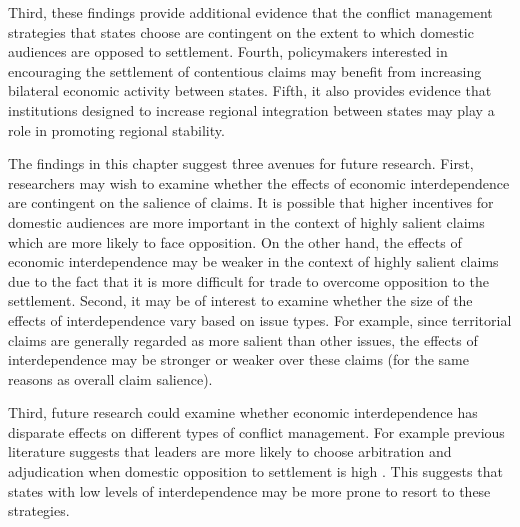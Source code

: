 \documentclass[../../dissertation.tex]{subfiles}
\begin{document}
Third, these findings provide additional evidence that the conflict management strategies that states choose are contingent on the extent to which domestic audiences are opposed to settlement. Fourth, policymakers interested in encouraging the settlement of contentious claims may benefit from increasing bilateral economic activity between states. Fifth, it also provides evidence that institutions designed to increase regional integration between states may play a role in promoting regional stability.

The findings in this chapter suggest three avenues for future research. First, researchers may wish to examine whether the effects of economic interdependence are contingent on the salience of claims. It is possible that higher incentives for domestic audiences are more important in the context of highly salient claims which are more likely to face opposition. On the other hand, the effects of economic interdependence may be weaker in the context of highly salient claims due to the fact that it is more difficult for trade to overcome opposition to the settlement. Second, it may be of interest to examine whether the size of the effects of interdependence vary based on issue types. For example, since territorial claims are generally regarded as more salient than other issues, the effects of interdependence may be stronger or weaker over these claims (for the same reasons as overall claim salience). 

Third, future research could examine whether economic interdependence has disparate effects on different types of conflict management. For example previous literature suggests that leaders are more likely to choose arbitration and adjudication when domestic opposition to settlement is high \citep[e.g., ][]{allee2006}. This suggests that states with low levels of interdependence may be more prone to resort to these strategies.



\end{document}
